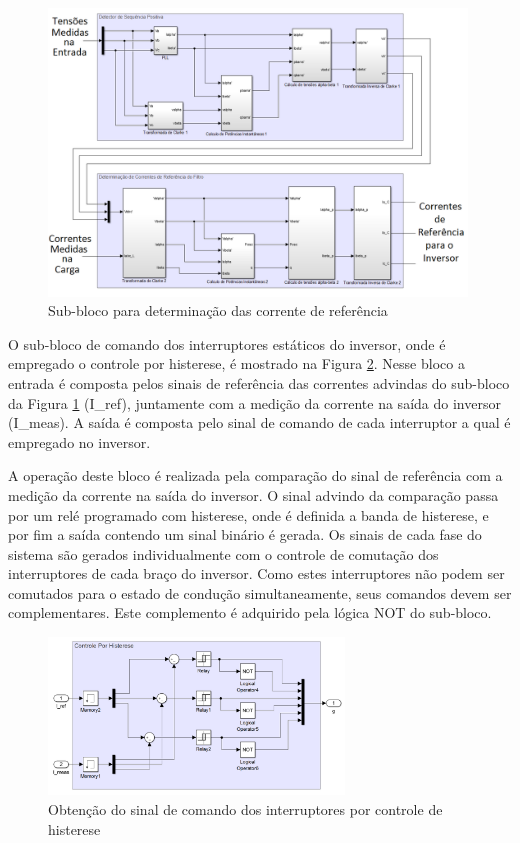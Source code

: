 \begin{figure}[!htb] %
	\centering
	\includegraphics[width=0.99\textwidth]{Cap4/Figuras/controlador.png}
	\caption{Sub-bloco para determinação das corrente de referência}
	\label{fig:controladador.png}
\end{figure}

O sub-bloco de comando dos interruptores estáticos do inversor, onde é empregado o controle por histerese, é mostrado na Figura \ref{fig:histerese_sim.png}. Nesse bloco a entrada é composta pelos sinais de referência das correntes advindas do sub-bloco da Figura \ref{fig:controladador.png} (I\_ref), juntamente com a medição da corrente na saída do inversor (I\_meas). A saída é composta pelo sinal de comando de cada interruptor a qual é empregado no inversor.

A operação deste bloco é realizada pela comparação do sinal de referência com a medição da corrente na saída do inversor. O sinal advindo da comparação passa por um relé programado com histerese, onde é definida a banda de histerese, e por fim a saída contendo um sinal binário é gerada. Os sinais de cada fase do sistema são gerados individualmente com o controle de comutação dos interruptores de cada braço do inversor. Como estes interruptores não podem ser comutados para o estado de condução simultaneamente, seus comandos devem ser complementares. Este complemento é adquirido pela lógica NOT do sub-bloco.

\begin{figure}[!htb] %
	\centering
	\includegraphics[width=0.7\textwidth]{Cap4/Figuras/histerese_sim.png}
	\caption{Obtenção do sinal de comando dos interruptores por controle de histerese}
	\label{fig:histerese_sim.png}
\end{figure}

